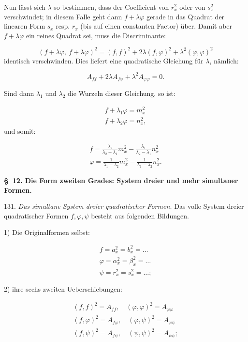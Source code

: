 \documentclass[11pt]{article}
\begin{document}
Nun lässt sich $\lambda$ so bestimmen, dass der Coefficient von $r_x^2$ oder von
$s_x^2$ verschwindet; in diesem Falle geht dann $f+\lambda\varphi$ gerade in das
Quadrat der linearen Form $s_x$ resp. $r_x$ (bis auf einen constanten Factor) über.
Damit aber $f+\lambda\varphi$ ein reines Quadrat sei, muss die Discriminante:

\[
(f+\lambda\varphi,\ f+\lambda\varphi)^2 = (f,f)^2 + 2\lambda(f,\varphi)^2 + \lambda^2(\varphi,\varphi)^2
\]
identisch verschwinden. Dies liefert eine quadratische Gleichung für $\lambda$,
nämlich:

\[
A_{ff} + 2\lambda A_{f\varphi} + \lambda^2 A_{\varphi\varphi} = 0.
\]

Sind dann $\lambda_1$ und $\lambda_2$ die Wurzeln dieser Gleichung, so ist:

\[
\begin{gathered}
f + \lambda_1\varphi = m_x^2\\
f + \lambda_2\varphi = n_x^2,
\end{gathered}
\]
und somit:

\[
\begin{gathered}
f = \frac{\lambda_2}{\lambda_2-\lambda_1}m_x^2 - \frac{\lambda_1}{\lambda_2-\lambda_1}n_x^2\\
\varphi = \frac{1}{\lambda_1-\lambda_2}m_x^2 - \frac{1}{\lambda_1-\lambda_2}n_x^2.
\end{gathered}
\]

\begin{center}
\textbf{\S\ 12. Die Form zweiten Grades: System dreier und mehr simultaner Formen.}
\end{center}

131. \textit{Das simultane System dreier quadratischer Formen.} Das volle System
dreier quadratischer Formen $f,\varphi,\psi$ besteht aus folgenden Bildungen.

1) Die Originalformen selbst:

\[
\begin{gathered}
f = a_x^2 = b_x^2 = \dots\\
\varphi = \alpha_x^2 = \beta_x^2 = \dots\\
\psi = r_x^2 = s_x^2 = \dots;
\end{gathered}
\]

2) ihre sechs zweiten Ueberschiebungen:

\[
\begin{gathered}
(f,f)^2 = A_{ff}, \quad (\varphi,\varphi)^2 = A_{\varphi\varphi}\\
(f,\varphi)^2 = A_{f\varphi}, \quad (\varphi,\psi)^2 = A_{\varphi\psi}\\
(f,\psi)^2 = A_{f\psi}, \quad (\psi,\psi)^2 = A_{\psi\psi};
\end{gathered}
\]
\end{document}
